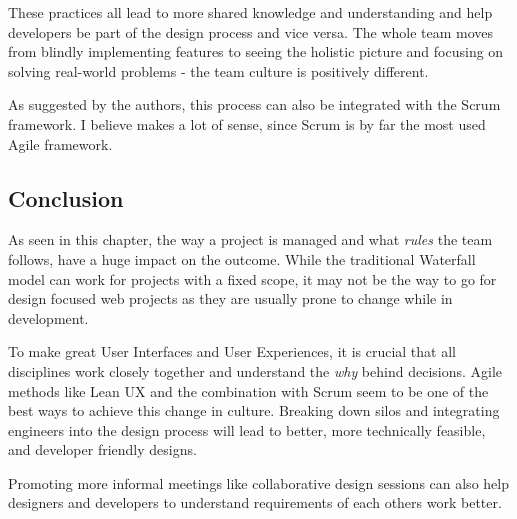 These practices all lead to more shared knowledge and understanding and help developers be part of
the design process and vice versa. The whole team moves from blindly implementing features to seeing
the holistic picture and focusing on solving real-world problems - the team culture is positively
different.

As suggested by the authors, this process can also be integrated with the Scrum framework. I believe
makes a lot of sense, since Scrum is by far the most used Agile framework.

\subsection{Conclusion}

As seen in this chapter, the way a project is managed and what \textit{rules} the team follows, have 
a huge impact on the outcome. While the traditional Waterfall model can work for projects with a
fixed scope, it may not be the way to go for design focused web projects as they are usually prone
to change while in development.

To make great User Interfaces and User Experiences, it is crucial that all disciplines work closely
together and understand the \textit{why} behind decisions. Agile methods like Lean UX and the
combination with Scrum seem to be one of the best ways to achieve this change in culture.
Breaking down silos and integrating engineers into the design process will lead to better, more
technically feasible, and developer friendly designs. 

Promoting more informal meetings like collaborative design sessions can also help designers and
developers to understand requirements of each others work better. 
